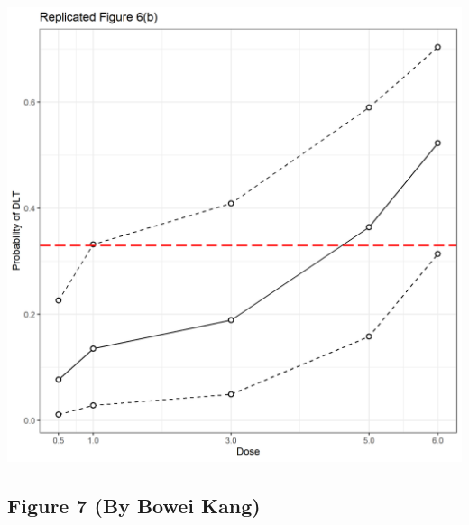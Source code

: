 \documentclass[
]{article}
\begin{document}
\includegraphics{fig6b_zkl.png}

\hypertarget{figure-7-by-bowei-kang}{%
\subsection{Figure 7 (By Bowei Kang)}\label{figure-7-by-bowei-kang}}
\end{document}
